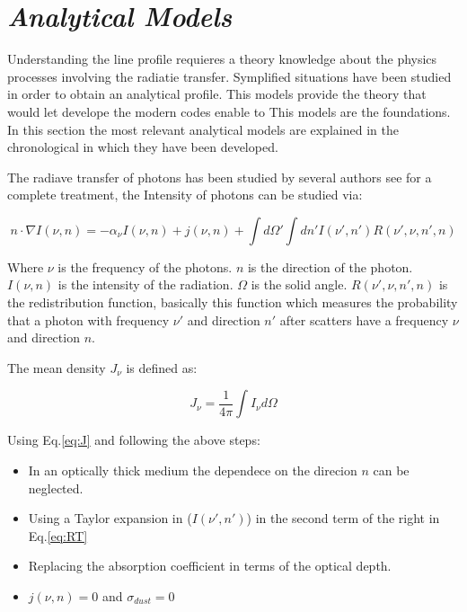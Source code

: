   

\section{\emph{Analytical Models}}\label{sec:analytic}

Understanding the \ly line profile requieres a theory knowledge
about the physics processes involving the radiatie transfer. Symplified 
situations have been studied in order to obtain an analytical 
 profile. This models provide the theory that
would let develope the modern codes enable to 
This models are the foundations. In this section the most relevant 
analytical models are explained in the chronological in which 
they have been developed. 

The radiave transfer of \ly photons has been studied by several authors
see \citep{RybickiLightman79} for a complete treatment, the Intensity
of \ly photons can be studied via:
 
\begin{equation}\label{eq:RT}
n\cdot\nabla I(\nu, n)= - \alpha_{\nu} I(\nu, n) + j(\nu, n) + \int d\Omega' \int dn' I(\nu', n') R(\nu', \nu, n', n)
\end{equation}

Where $\nu$ is the frequency of the \ly photons. $n$ is the direction 
of the \ly photon. $I(\nu, n)$ is the intensity
of the radiation. $\Omega$ is the solid angle. $R(\nu', \nu, n', n)$ 
is the redistribution function, basically this function which measures 
the probability that a \ly photon with frequency $\nu'$ and direction $n'$
after scatters have a frequency $\nu$ and direction $n$.

The mean density $J_{\nu}$ is defined as:

\begin{equation}\label{eq:J}
J_{\nu} = \dfrac{1}{4\pi}\int I_{\nu}d\Omega
\end{equation}


Using Eq.\ref{eq:J} and following the above steps:

\begin{itemize}
\item In an optically thick medium the dependece on the direcion {\bf{$n$}} can 
be neglected.
\item Using a Taylor expansion in ($I(\nu', n')$) in the second term of the right in Eq.\ref{eq:RT} 
\item Replacing the absorption coefficient in terms of the optical depth.
\item $j(\nu, n)=0$ and $\sigma_{dust}=0$
\end{itemize}


